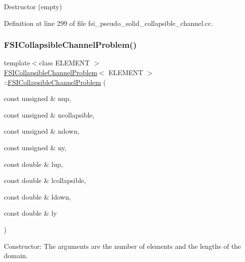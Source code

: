 Destructor (empty) 



Definition at line 299 of file fsi\+\_\+pseudo\+\_\+solid\+\_\+collapsible\+\_\+channel.\+cc.

\mbox{\label{classFSICollapsibleChannelProblem_afe14ae0d2bdfc9a15969c9bdcd6e2512}} 
\subsubsection{\texorpdfstring{F\+S\+I\+Collapsible\+Channel\+Problem()}{FSICollapsibleChannelProblem()}\hspace{0.1cm}{\footnotesize\ttfamily [4/4]}}
{\footnotesize\ttfamily template$<$class E\+L\+E\+M\+E\+NT $>$ \\
\hyperlink{classFSICollapsibleChannelProblem}{F\+S\+I\+Collapsible\+Channel\+Problem}$<$ E\+L\+E\+M\+E\+NT $>$\+::\hyperlink{classFSICollapsibleChannelProblem}{F\+S\+I\+Collapsible\+Channel\+Problem} (\begin{DoxyParamCaption}\item[{const unsigned \&}]{nup,  }\item[{const unsigned \&}]{ncollapsible,  }\item[{const unsigned \&}]{ndown,  }\item[{const unsigned \&}]{ny,  }\item[{const double \&}]{lup,  }\item[{const double \&}]{lcollapsible,  }\item[{const double \&}]{ldown,  }\item[{const double \&}]{ly }\end{DoxyParamCaption})}



Constructor\+: The arguments are the number of elements and the lengths of the domain. 

\mbox{\label{classFSICollapsibleChannelProblem_abe33aaaae15ea3eb10885527a1d1ad9a}} 
